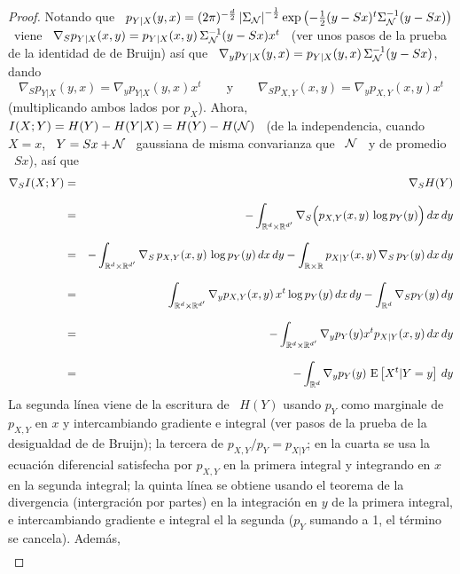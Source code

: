 %
\begin{proof}
  Notando  que \ $p_{Y|X}  (y,x) =  (2 \pi)^{-\frac{d}{2}}  \left| \Sigma_{\mathcal{N}}
  \right|^{-\frac12}  \exp\left( -\frac12  (y-S  x)^t \Sigma_{\mathcal{N}}^{-1}  (y-Sx)
  \right)$ \ viene \ $\nabla_S p_{Y|X}(x,y) = p_{Y|X}(x,y) \, \Sigma_{\mathcal{N}}^{-1}
  (y - S  x) x^t$ \ (ver unos pasos  de la prueba de la  identidad de de Bruijn)
  as\'i que \ $\nabla_y p_{Y|X}(y,x) = p_{Y|X}(y,x) \, \Sigma_{\mathcal{N}}^{-1} (y - S
  x)$, dando
  \[
  \nabla_S  p_{Y|X}(y,x)  = \nabla_y  p_{Y|X}(y,x)  x^t  \qquad \mbox{y}  \qquad
  \nabla_S p_{X,Y}(x,y) = \nabla_y p_{X,Y}(x,y) x^t
  \]
  (multiplicando ambos lados por $p_X$). Ahora, \ $I(X;Y) = H(Y) - H(Y|X) = H(Y)
  - H(\mathcal{N})$ \ (de la independencia, cuando \ $X  = x$, \ $Y = S x + \mathcal{N}$ \
  gaussiana de misma convarianza que \ $\mathcal{N}$  \ y de promedio \ $S x$), as\'i
  que
  \begin{eqnarray*}
  \nabla_S I(X;Y) & = & \nabla_S H(Y)\\[2.5mm]
  & = & - \int_{\mathbb{R}^d \times \mathbb{R}^{d'}} \nabla_S \Big( p_{X,Y}(x,y) \, \log
  p_Y(y) \Big) \, dx \, dy\\[2.5mm]
  & = & - \int_{\mathbb{R}^d \times \mathbb{R}^{d'}} \nabla_S \, p_{X,Y}(x,y) \, \log p_Y(y) \,
  dx \, dy - \int_{\mathbb{R} \times \mathbb{R}} p_{X|Y}(x,y) \, \nabla_S \, p_Y(y) \, dx \,
  dy\\[2.5mm]
  & = & \int_{\mathbb{R}^d \times \mathbb{R}^{d'}} \nabla_y p_{X,Y}(x,y) \, x^t \log p_Y(y)
  \, dx \, dy - \int_{\mathbb{R}^d} \nabla_S p_Y(y) \, dy\\[2.5mm]
  & = & - \int_{\mathbb{R}^d \times \mathbb{R}^{d'}} \nabla_y p_Y(y) x^t p_{X|Y}(x,y) \, dx
  \, dy\\[2.5mm]
  & = & - \int_{\mathbb{R}^d} \nabla_y p_Y(y) \, \operatorname{E}\left[X^t | Y = y \right] \, dy
  \end{eqnarray*}
  La  segunda l\'inea  viene  de la  escritura  de \  $H(Y)$  usando $p_Y$  como
  marginale de $p_{X,Y}$ en $x$ y intercambiando gradiente e integral (ver pasos
  de la  prueba de la  desigualdad de de  Bruijn); la tercera de  $p_{X,Y}/p_Y =
  p_{X|Y}$;  en  la cuarta  se  usa  la  ecuaci\'on diferencial  satisfecha  por
  $p_{X,Y}$ en la  primera integral y integrando en $x$  en la segunda integral;
  la  quinta   l\'inea  se   obtiene  usando  el   teorema  de   la  divergencia
  (intergraci\'on por partes) en la integraci\'on en $y$ de la primera integral,
  e intercambiando  gradiente e integral  el la segunda  ($p_Y$ sumando a  1, el
  t\'ermino se cancela). Adem\'as,
  \begin{eqnarray*}

\end{eqnarray*}
\end{proof}
